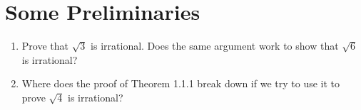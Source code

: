 \documentclass{lew98_solutions}
\begin{document}
\setcounter{section}{1}
\section{Some Preliminaries}
\label{sec:1.2}

\begin{exercise}
\label{ex:1.2.1}
    \begin{enumerate}
        \item Prove that \( \sqrt{3} \) is irrational. Does the same argument work to show that \( \sqrt{6} \) is irrational?
    
        \item Where does the proof of Theorem 1.1.1 break down if we try to use it to prove \( \sqrt{4} \) is irrational?
    \end{enumerate}
\end{exercise}
\end{document}
